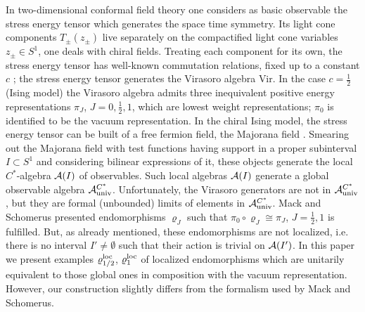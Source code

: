 \documentclass[10pt,a4paper]{article}
\begin{document}
In two-dimensional conformal field theory one considers
as basic observable the stress energy tensor which
generates the space time symmetry. Its light
cone components $T_\pm(z_\pm)$ live separately on the
compactified light cone variables $z_\pm\in S^1$, one
deals with chiral fields.
Treating each component for its own, the stress energy
tensor has well-known commutation relations, fixed
up to a constant $c$ \cite{Berti,Mack};
the stress energy tensor generates the Virasoro
algebra {\sf Vir}. In the case $c=\frac{1}{2}$
(Ising model) the Virasoro algebra admits three
inequivalent positive energy representations
$\pi_J$, $J=0,\frac{1}{2},1$, which are lowest weight
representations; $\pi_0$ is identified to be the
vacuum representation. In the chiral Ising model, the
stress energy tensor can be built of a free fermion
field, the Majorana field \cite{MS1,Mack}.
Smearing out the Majorana
field with test functions having support in a
proper subinterval $I\subset S^1$ and considering
bilinear expressions of it, these objects generate
the local $C^*$-algebra ${\cal A}(I)$ of observables.
Such local algebras ${\cal A}(I)$ generate
a global observable algebra ${\cal A}_{\rm univ}^{C^*}$.
Unfortunately, the Virasoro generators are not in
${\cal A}_{\rm univ}^{C^*}$, but they are formal
(unbounded) limits of elements in
${\cal A}_{\rm univ}^{C^*}$.
Mack and Schomerus \cite{MS1,MS2} presented
endomorphisms $\varrho_J$ such that
$\pi_0\circ\varrho_J\cong\pi_J$, $J=\frac{1}{2},1$ is
fulfilled. But, as already mentioned, these endomorphisms are
not localized, i.e. there is no interval $I'\neq\emptyset$
such that their action is trivial on ${\cal A}(I')$. In this
paper we present examples $\varrho_{1/2}^{\rm loc}$,
$\varrho_1^{\rm loc}$ of localized endomorphisms which are
unitarily equivalent to those global ones in composition
with the vacuum representation. However, our construction
slightly differs from the formalism used by
Mack and Schomerus.
\end{document}

